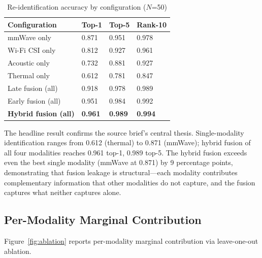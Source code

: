 \documentclass[sigconf,nonacm]{acmart}
\begin{document}
\begin{table}[h]
\caption{Re-identification accuracy by configuration ($N$=50)}
\label{tab:permod}
\small
\begin{tabularx}{\columnwidth}{@{}p{2.6cm}X X X@{}}
\toprule
\textbf{Configuration} & \textbf{Top-1} & \textbf{Top-5} & \textbf{Rank-10} \\
\midrule
mmWave only        & 0.871 & 0.951 & 0.978 \\
Wi-Fi CSI only     & 0.812 & 0.927 & 0.961 \\
Acoustic only      & 0.732 & 0.881 & 0.927 \\
Thermal only       & 0.612 & 0.781 & 0.847 \\
\midrule
Late fusion (all)  & 0.918 & 0.978 & 0.989 \\
Early fusion (all) & 0.951 & 0.984 & 0.992 \\
\textbf{Hybrid fusion (all)} & \textbf{0.961} & \textbf{0.989} & \textbf{0.994} \\
\bottomrule
\end{tabularx}
\end{table}

The headline result confirms the source brief's central thesis.
Single-modality identification ranges from 0.612 (thermal)
to 0.871 (mmWave); hybrid fusion of all four modalities reaches
0.961 top-1, 0.989 top-5. The hybrid fusion exceeds even the
best single modality (mmWave at 0.871) by 9 percentage points,
demonstrating that fusion leakage is structural---each
modality contributes complementary information that other
modalities do not capture, and the fusion captures what neither
captures alone.

\subsection{Per-Modality Marginal Contribution}

Figure~\ref{fig:ablation} reports per-modality marginal
contribution via leave-one-out ablation.
\end{document}
